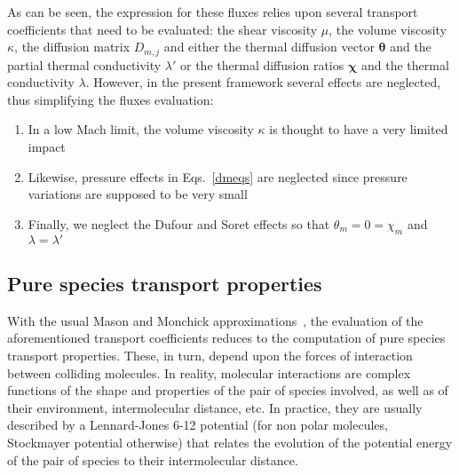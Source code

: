 As can be seen, the expression for these fluxes relies upon several transport coefficients that need to be evaluated: the shear viscosity $\mu$, the volume viscosity $\kappa$, the diffusion matrix $ {D}_{m,j} $ and either the thermal diffusion vector $\boldsymbol{\theta}$ and the partial thermal conductivity $\lambda'$ or the thermal diffusion ratios $\boldsymbol{\chi}$ and the thermal conductivity $\lambda$. However, in the present framework several effects are neglected, thus simplifying the fluxes evaluation:
\begin{enumerate}
\item In a low Mach limit, the volume viscosity $\kappa$ is thought to have a very limited impact
\item Likewise, pressure effects in Eqs.~\ref{dmeqs} are neglected since pressure variations are supposed to be very small
\item Finally, we neglect the Dufour and Soret effects so that $\theta_m = 0 = \chi_m$ and $\lambda = \lambda '$
\end{enumerate}

\subsection{Pure species transport properties}
With the usual Mason and Monchick approximations~\cite{Mason:1962}, the evaluation of the aforementioned transport coefficients reduces to the computation of pure species transport properties. These, in turn, depend upon the forces of interaction between colliding molecules. In reality, molecular interactions are complex functions of the shape and properties of the pair of species involved, as well as of their environment, intermolecular distance, etc. In practice, they are usually described by a Lennard-Jones 6-12 potential (for non polar molecules, Stockmayer potential otherwise) that relates the evolution of the potential energy of the pair of species to their intermolecular distance.

